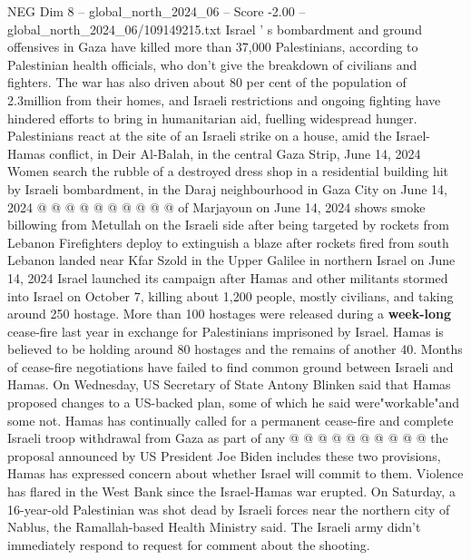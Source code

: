 \begin{textsample}{NEG Dim 8 – global\_north\_2024\_06 – Score -2.00 – global\_north\_2024\_06/109149215.txt}
Israel ' s bombardment and ground offensives in Gaza have killed more than 37,000 Palestinians, according to Palestinian health officials, who don't give the breakdown of civilians and fighters.
The war has also driven about 80 per cent of the population of 2.3million from their homes, and Israeli restrictions and ongoing fighting have hindered efforts to bring in humanitarian aid, fuelling widespread hunger.
Palestinians react at the site of an Israeli strike on a house, amid the Israel-Hamas conflict, in Deir Al-Balah, in the central Gaza Strip, June 14, 2024 Women search the rubble of a destroyed dress shop in a residential building hit by Israeli bombardment, in the Daraj neighbourhood in Gaza City on June 14, 2024 @ @ @ @ @ @ @ @ @ @ of Marjayoun on June 14, 2024 shows smoke billowing from Metullah on the Israeli side after being targeted by rockets from Lebanon Firefighters deploy to extinguish a blaze after rockets fired from south Lebanon landed near Kfar Szold in the Upper Galilee in northern Israel on June 14, 2024 Israel launched its campaign after Hamas and other militants stormed into Israel on October 7, killing about 1,200 people, mostly civilians, and taking around 250 hostage.
More than 100 hostages were released during a \textbf{week-long} cease-fire last year in exchange for Palestinians imprisoned by Israel.
Hamas is believed to be holding around 80 hostages and the remains of another 40.
Months of cease-fire negotiations have failed to find common ground between Israeli and Hamas.
On Wednesday, US Secretary of State Antony Blinken said that Hamas proposed changes to a US-backed plan, some of which he said were"workable"and some not.
Hamas has continually called for a permanent cease-fire and complete Israeli troop withdrawal from Gaza as part of any @ @ @ @ @ @ @ @ @ @ the proposal announced by US President Joe Biden includes these two provisions, Hamas has expressed concern about whether Israel will commit to them.
Violence has flared in the West Bank since the Israel-Hamas war erupted.
On Saturday, a 16-year-old Palestinian was shot dead by Israeli forces near the northern city of Nablus, the Ramallah-based Health Ministry said.
The Israeli army didn't immediately respond to request for comment about the shooting.

\end{textsample}
